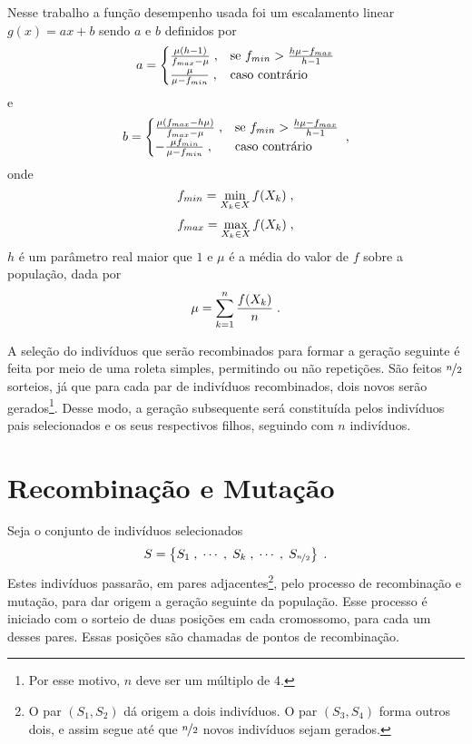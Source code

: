 Nesse trabalho a função desempenho usada foi um escalamento linear\cite{goldberg1989ga} $ g(x) = ax + b $
sendo $a$ e $b$ definidos por
\begin{equation}
  a =
  \begin{cases}
    \frac{\mu (h - 1)}{f_{max} - \mu} \;, & \text{se } f_{min} > \frac{h\mu - f_{max}}{h - 1} \\
    \frac{\mu}{\mu - f_{min}}         \;, & \text{caso contrário}
  \end{cases}
  \label{eq:linear_fit_a}
\end{equation}
e
\begin{equation}
  b =
  \begin{cases}
    \frac{\mu (f_{max} - h\mu)}{f_{max} - \mu} \;, & \text{se } f_{min} > \frac{h\mu - f_{max}}{h - 1} \\
    - \frac{\mu f_{min}}{\mu - f_{min}}         \;, & \text{caso contrário}
  \end{cases}
  \;\mathrm{,}
  \label{eq:linear_fit_b}
\end{equation}
onde
\begin{equation}
  f_{min} = \min_{X_k \in X} f(X_k) \;\mathrm{,}
\end{equation}
\begin{equation}
  f_{max} = \max_{X_k \in X} f(X_k) \;\mathrm{,}
\end{equation}
$h$ é um parâmetro real maior que $1$ e $\mu$ é a média do valor de $f$ sobre a população, dada por
\begin{equation}
  \mu = \sum_{k = 1}^n \frac{f(X_k)}{n} \;\mathrm{.}
\end{equation}

A seleção do indivíduos que serão recombinados para formar a geração seguinte é feita por meio
de uma roleta simples, permitindo ou não repetições. São feitos $ \nicefrac{n}{2} $ sorteios,
já que para cada par de indivíduos recombinados, dois novos serão gerados\footnote{
  Por esse motivo, $n$ deve ser um múltiplo de 4.
}.
Desse modo, a geração subsequente será constituída pelos indivíduos pais selecionados e os seus
respectivos filhos, seguindo com $n$ indivíduos.

\section{Recombinação e Mutação}

Seja o conjunto de indivíduos selecionados
\begin{equation}
  S = \left\{ S_1\;, \;\cdots\;,  \;S_k\;, \;\cdots\;, \;S_{\nicefrac{n}{2}} \right\} \;\mathrm{.}
  \label{eq:selection}
\end{equation}
Estes indivíduos passarão, em pares adjacentes\footnote{
  O par $ (S_1, S_2) $ dá origem a dois indivíduos. O par $ (S_3, S_4) $ forma outros dois, e assim segue
  até que $ \nicefrac{n}{2} $ novos indivíduos sejam gerados.
}, pelo processo de recombinação e mutação, para dar origem a
geração seguinte da população. Esse processo é iniciado com o sorteio de duas posições em cada cromossomo,
para cada um desses pares. Essas posições são chamadas de pontos de recombinação.

